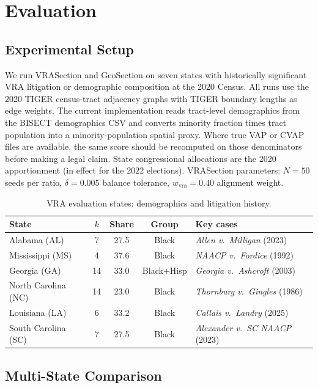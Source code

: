 \section{Evaluation}
\label{sec:evaluation}

\subsection{Experimental Setup}

We run VRASection and GeoSection on seven states with historically significant
VRA litigation or demographic composition at the 2020 Census.
All runs use the 2020 TIGER census-tract adjacency graphs with TIGER boundary
lengths as edge weights.
The current implementation reads tract-level demographics from the BISECT
demographics CSV and converts minority fraction times tract population into a
minority-population spatial proxy.  Where true VAP or CVAP files are available,
the same score should be recomputed on those denominators before making a
legal claim.
State congressional allocations are the 2020 apportionment (in effect for
the 2022 elections).
VRASection parameters: $N = 50$ seeds per ratio, $\delta = 0.005$ balance
tolerance, $w_\text{vra} = 0.40$ alignment weight.

\begin{table}[t]
\centering
\small
\caption{VRA evaluation states: demographics and litigation history.}
\label{tab:states}
\begin{tabular}{@{}lcccl@{}}
\toprule
\textbf{State} & \textbf{$k$} & \textbf{Share} & \textbf{Group} & \textbf{Key cases} \\
\midrule
Alabama (AL) & 7  & 27.5 & Black      & \emph{Allen v.\ Milligan} (2023) \\
Mississippi (MS) & 4 & 37.6 & Black   & \emph{NAACP v.\ Fordice} (1992) \\
Georgia (GA) & 14 & 33.0 & Black+Hisp & \emph{Georgia v.\ Ashcroft} (2003) \\
North Carolina (NC) & 14 & 23.0 & Black & \emph{Thornburg v.\ Gingles} (1986) \\
Louisiana (LA) & 6 & 33.2 & Black     & \emph{Callais v.\ Landry} (2025) \\
South Carolina (SC) & 7 & 27.5 & Black & \emph{Alexander v.\ SC NAACP} (2023) \\
\bottomrule
\end{tabular}
\end{table}

\subsection{Multi-State Comparison}

